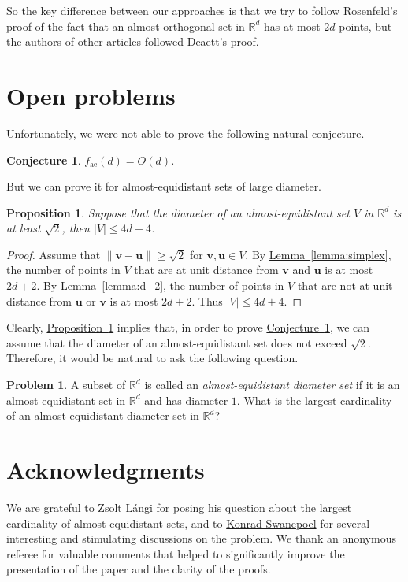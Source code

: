 \documentclass[a4paper, oneside, reqno, 12pt]{amsart}
\theoremstyle{plain}
\newtheorem{conjecture}[theorem]{Conjecture}
\newtheorem{proposition}[theorem]{Proposition}
\theoremstyle{definition}
\newtheorem{problem}[theorem]{Problem}
\begin{document}
So the key difference between our approaches is that we try to follow Rosenfeld's proof of the fact that an almost orthogonal set in $\mathbb R^d$ has at most $2d$ points, but the authors of other articles followed Deaett's proof. 
\section{Open problems}\label{section:problems}

Unfortunately, we were not able to prove the following natural conjecture. 
\begin{conjecture}
	\label{conjecture:almost}
	$f_{\mathrm{ae}}(d)=O(d)$.
\end{conjecture}
But we can prove it for almost-equidistant sets of large diameter.
\begin{proposition}
\label{proposition:diameter}
Suppose that the diameter of an almost-equidistant set $V$ in $\mathbb R^d$ is at least $\sqrt{2}$, then $|V|\leq 4d+4$.
\end{proposition}
\begin{proof}
Assume that $\|\mathbf v-\mathbf u\|\geq \sqrt{2}$ for $\mathbf v, \mathbf u\in V$. By \hyperref[lemma:simplex]{Lemma~\ref*{lemma:simplex}}, the number of points in $V$ that are at unit distance from $\mathbf v$ and $\mathbf u$ is at most $2d+2$. By \hyperref[lemma:d+2]{Lemma~\ref*{lemma:d+2}}, the number of points in $V$ that are not at unit distance from $\mathbf u$ or $\mathbf v$ is at most $2d+2$. Thus $|V|\leq 4d+4$.
\end{proof}
Clearly, \hyperref[proposition:diameter]{Proposition~\ref{proposition:diameter}} implies that, in order to prove \hyperref[conjecture:almost]{Conjecture~\ref{conjecture:almost}}, we can assume that the diameter of an almost-equidistant set does not exceed $\sqrt{2}$.
Therefore, it would be natural to ask the following question.
\begin{problem}
	\label{problem:diameter}
	A subset of $\mathbb R^d$ is called an \textit{almost-equidistant diameter set} if it is an almost-equidistant set in $\mathbb R^d$ and has diameter $1$. What is the largest cardinality of an almost-equidistant diameter set in $\mathbb R^d$?
\end{problem}
\section*{Acknowledgments}
We are grateful to \href{http://math.bme.hu/~zlangi/}{Zsolt L\'angi} for posing his question about the largest cardinality of almost-equidistant sets, and to \href{http://personal.lse.ac.uk/swanepoe/index.html}{Konrad Swanepoel} for several interesting and stimulating discussions on the problem. We thank an anonymous referee for valuable comments that helped to significantly improve the presentation of the paper and the clarity of the proofs.
\end{document}

